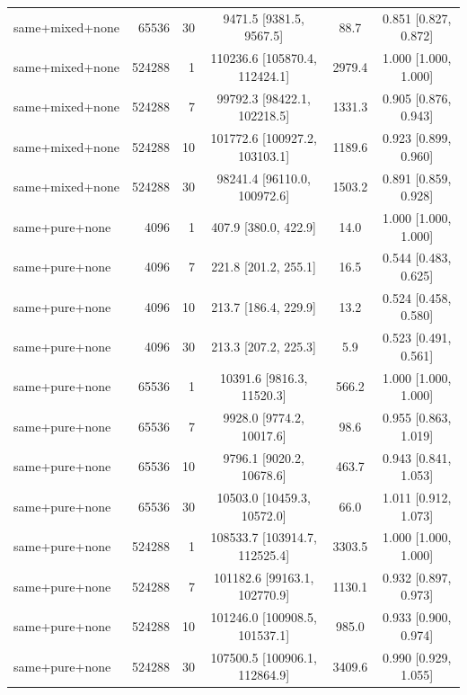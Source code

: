 \begin{longtable}{lrrccc}
same+mixed+none & 65536 & 30 & 9471.5 [9381.5, 9567.5] & 88.7 & 0.851 [0.827, 0.872] \\
same+mixed+none & 524288 & 1 & 110236.6 [105870.4, 112424.1] & 2979.4 & 1.000 [1.000, 1.000] \\
same+mixed+none & 524288 & 7 & 99792.3 [98422.1, 102218.5] & 1331.3 & 0.905 [0.876, 0.943] \\
same+mixed+none & 524288 & 10 & 101772.6 [100927.2, 103103.1] & 1189.6 & 0.923 [0.899, 0.960] \\
same+mixed+none & 524288 & 30 & 98241.4 [96110.0, 100972.6] & 1503.2 & 0.891 [0.859, 0.928] \\
same+pure+none & 4096 & 1 & 407.9 [380.0, 422.9] & 14.0 & 1.000 [1.000, 1.000] \\
same+pure+none & 4096 & 7 & 221.8 [201.2, 255.1] & 16.5 & 0.544 [0.483, 0.625] \\
same+pure+none & 4096 & 10 & 213.7 [186.4, 229.9] & 13.2 & 0.524 [0.458, 0.580] \\
same+pure+none & 4096 & 30 & 213.3 [207.2, 225.3] & 5.9 & 0.523 [0.491, 0.561] \\
same+pure+none & 65536 & 1 & 10391.6 [9816.3, 11520.3] & 566.2 & 1.000 [1.000, 1.000] \\
same+pure+none & 65536 & 7 & 9928.0 [9774.2, 10017.6] & 98.6 & 0.955 [0.863, 1.019] \\
same+pure+none & 65536 & 10 & 9796.1 [9020.2, 10678.6] & 463.7 & 0.943 [0.841, 1.053] \\
same+pure+none & 65536 & 30 & 10503.0 [10459.3, 10572.0] & 66.0 & 1.011 [0.912, 1.073] \\
same+pure+none & 524288 & 1 & 108533.7 [103914.7, 112525.4] & 3303.5 & 1.000 [1.000, 1.000] \\
same+pure+none & 524288 & 7 & 101182.6 [99163.1, 102770.9] & 1130.1 & 0.932 [0.897, 0.973] \\
same+pure+none & 524288 & 10 & 101246.0 [100908.5, 101537.1] & 985.0 & 0.933 [0.900, 0.974] \\
same+pure+none & 524288 & 30 & 107500.5 [100906.1, 112864.9] & 3409.6 & 0.990 [0.929, 1.055] \\
\end{longtable}
